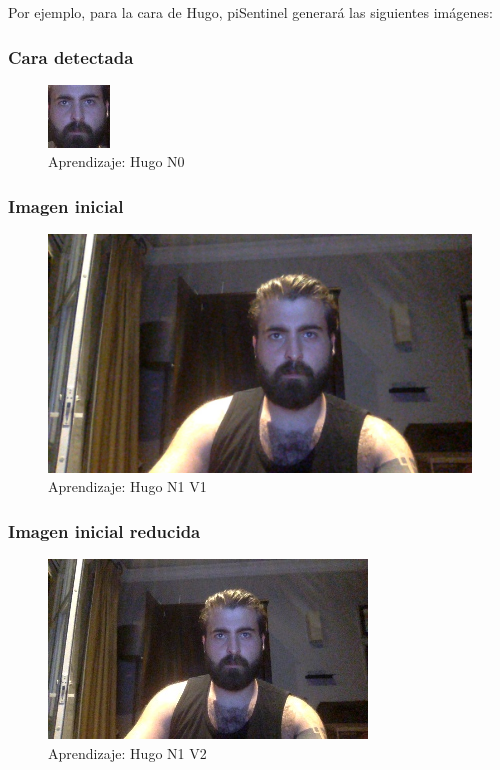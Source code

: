 \documentclass[a4paper,11pt]{book}
\begin{document}
Por ejemplo, para la cara de Hugo, piSentinel generará las siguientes imágenes: 

\subsubsection{Cara detectada}
\begin{figure}[H]  
\centering 
\includegraphics[scale=0.80]{imagenes/Hugo_N0_20190529225417v0.jpg}
\caption{ Aprendizaje: Hugo N0}  
\end{figure} 

\subsubsection{Imagen inicial}
\begin{figure}[H]  
\centering 
\includegraphics[scale=0.30]{imagenes/Hugo_N1_20190529225417v1.jpg}
\caption{ Aprendizaje: Hugo N1 V1}  
\end{figure} 

\subsubsection{Imagen inicial reducida}
\begin{figure}[H]  
\centering 
\includegraphics[scale=0.80]{imagenes/Hugo_N1_20190529225417v2.jpg}
\caption{ Aprendizaje: Hugo N1 V2}  
\end{figure} 
\end{document}
